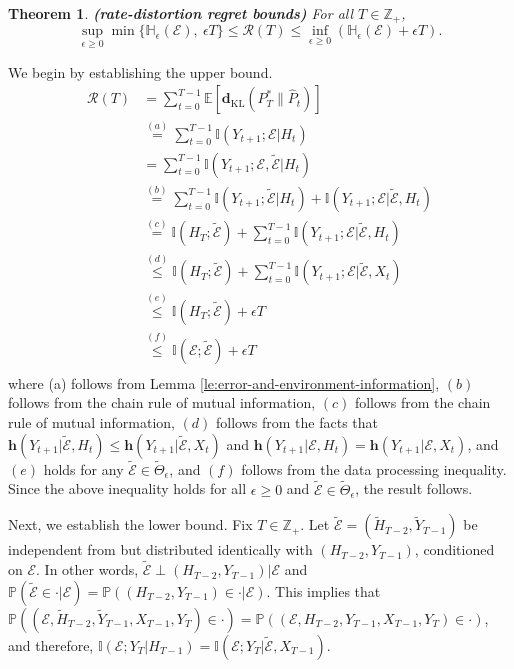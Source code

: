 \documentclass[twoside,11pt]{article}
\renewenvironment{proof}{\par\noindent{\bf Proof\ }}{\hfill\BlackBox\\[2mm]}
\newenvironment{proof}{\par\noindent{\bf Proof\ }}{\hfill\BlackBox\\[2mm]}
\newtheorem{theorem}{Theorem}
\def\environment{\mathcal{E}}
\def\proxy{\tilde{\environment}}
\def\proxyset{\tilde{\Theta}}
\def\regret{\mathcal{R}}
\def\KL{\mathbf{d}_{\mathrm{KL}}}
\def\diffentropy{\bf h}
\def\E{\mathbb{E}}
\def\H{\mathbb{H}}
\def\diffentropy{\mathbf{h}}
\def\I{\mathbb{I}}
\def\Pr{\mathbb{P}}
\begin{document}
\begin{theorem}\label{th:general-error-bound}{\bf (rate-distortion regret bounds)}
For all $T \in\mathbb{Z}_+$,
$$\sup_{\epsilon \geq 0} \min\{\H_\epsilon(\environment),\ \epsilon  T\} \leq \regret(T) \leq \inf_{\epsilon \geq 0}(\H_\epsilon(\environment) + \epsilon T).$$
\end{theorem}
\begin{proof} 
We begin by establishing the upper bound.
\begin{align*}
    \regret(T)
    & = \sum_{t=0}^{T-1} \E\left[\KL(P^*_T\|\hat{P}_t)\right]\\
    & \overset{(a)}{=} \sum_{t=0}^{T-1} \I(Y_{t+1};\environment|H_t)\\
    & = \sum_{t=0}^{T-1} \I(Y_{t+1}; \environment, \proxy | H_t) \nonumber\\
    & \overset{(b)}{=} \sum_{t=0}^{T-1} \I(Y_{t+1}; \proxy | H_t) + \I(Y_{t+1}; \environment | \proxy, H_t) \nonumber \\
    & \overset{(c)}{=} \I(H_T;\proxy) + \sum_{t=0}^{T-1} \I(Y_{t+1};\environment|\proxy, H_t)\\
    & \overset{(d)}{\leq} \I(H_T;\proxy) + \sum_{t=0}^{T-1} \I(Y_{t+1};\environment|\proxy, X_t)\\
    & \overset{(e)}{\leq} \I(H_T;\proxy) + \epsilon T\\
    & \overset{(f)}{\leq} \I(\environment;\proxy) + \epsilon T\\
\end{align*}
where (a) follows from Lemma \ref{le:error-and-environment-information}, $(b)$ follows from the chain rule of mutual information, $(c)$ follows from the chain rule of mutual information, $(d)$ follows from the facts that $\diffentropy(Y_{t+1}|\proxy, H_t) \leq \diffentropy(Y_{t+1}|\proxy, X_t)$ and $\diffentropy(Y_{t+1}|\environment, H_t) = \diffentropy(Y_{t+1}|\environment, X_t)$, and $(e)$ holds for any $\proxy\in\proxyset_\epsilon$, and $(f)$ follows from the data processing inequality.  Since the above inequality holds for all $\epsilon\geq 0$ and $\proxy\in\proxyset_\epsilon$, the result follows.
    
Next, we establish the lower bound. Fix $T \in \mathbb{Z}_+$.  Let $\proxy = (\tilde{H}_{T-2}, \tilde{Y}_{T-1})$ be independent from but distributed identically with $(H_{T-2}, Y_{T-1})$, conditioned on $\environment$.  In other words, $\proxy \perp (H_{T-2}, Y_{T-1}) | \environment$ and $\Pr(\proxy \in \cdot | \environment) = \Pr((H_{T-2}, Y_{T-1}) \in \cdot | \environment)$.  This implies that $\Pr((\environment, \tilde{H}_{T-2}, \tilde{Y}_{T-1}, X_{T-1}, Y_T) \in \cdot) = \Pr((\environment, H_{T-2}, Y_{T-1}, X_{T-1}, Y_T) \in \cdot)$, and therefore, $\I(\environment; Y_T | H_{T-1}) = \I(\environment; Y_T | \proxy, X_{T-1}).$



\end{proof}
\end{document}
